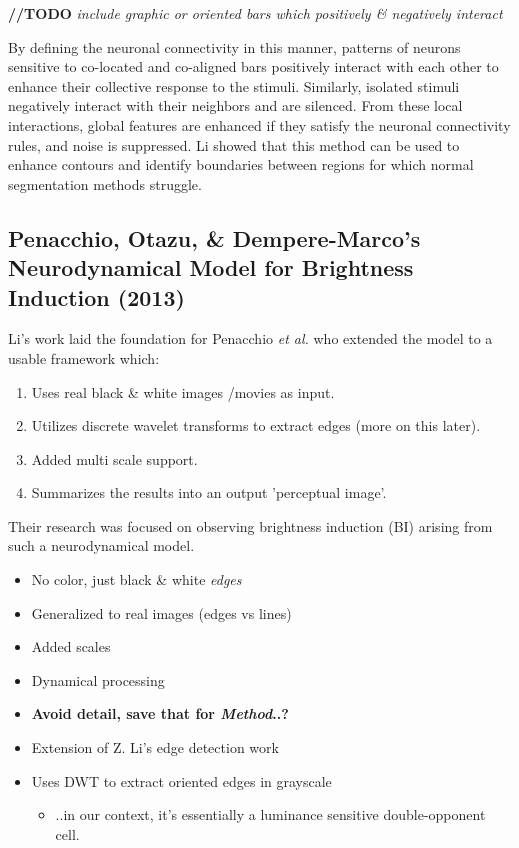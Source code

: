 \documentclass[journal,onecolumn]{IEEEtran}
\begin{document}
\textbf{//TODO} \textit{include graphic or oriented bars which positively \& negatively interact}

By defining the neuronal connectivity in this manner, patterns of neurons sensitive to co-located and co-aligned bars positively interact with each other to enhance their collective response to the stimuli. Similarly, isolated stimuli negatively interact with their neighbors and are silenced. From these local interactions, global features are enhanced if they satisfy the neuronal connectivity rules, and noise is suppressed. Li showed that this method can be used to enhance contours and identify boundaries between regions for which normal segmentation methods struggle.

\subsection*{Penacchio, Otazu, \& Dempere-Marco's Neurodynamical Model for Brightness Induction (2013)}
Li's work laid the foundation for Penacchio \textit{et al.} who extended the model to a usable framework which:
\begin{enumerate}
    \item Uses real black \& white images /movies as input.
    \item Utilizes discrete wavelet transforms to extract edges (more on this later).
    \item Added multi scale support.
    \item Summarizes the results into an output 'perceptual image'.
\end{enumerate}
Their research was focused on observing brightness induction (BI) arising from such a neurodynamical model.
\begin{itemize}
    \item No color, just black \& white \textit{edges}
    \item Generalized to real images (edges vs lines)
    \item Added scales
    \item Dynamical processing
    \item \textbf{Avoid detail, save that for \textit{Method}..?}
    \item Extension of Z. Li's edge detection work
    \item Uses DWT to extract oriented edges in grayscale
    \begin{itemize}
        \item ..in our context, it's essentially a luminance sensitive double-opponent cell.
    \end{itemize}
\end{itemize}
\end{document}
